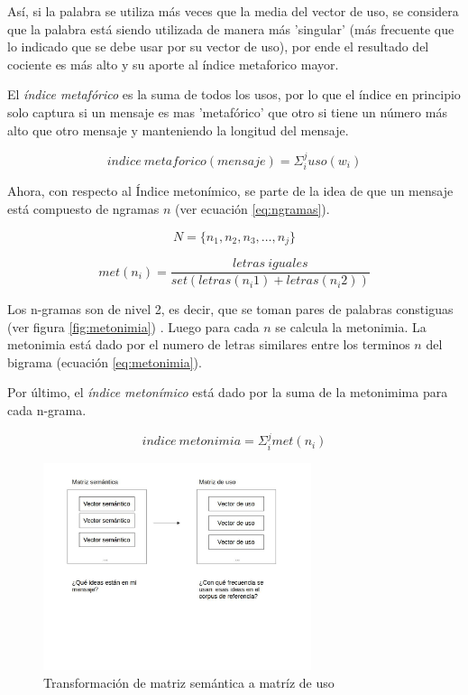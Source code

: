 \documentclass[12pt,letterpaper,twoside]{article}
\begin{document}
Así, si la palabra se utiliza más veces que la media del vector de
uso, se considera que la palabra está siendo utilizada de manera más
'singular' (más frecuente que lo indicado que se debe usar por su
vector de uso), por ende el resultado del cociente es más alto y su
aporte al índice metaforico mayor.




 El \emph{índice metafórico} es la suma de todos los usos, por lo que el
índice en principio solo captura si un mensaje es mas 'metafórico' que
otro si tiene un número más alto que otro mensaje y manteniendo la
longitud del mensaje.


\begin{equation}
\label{eq:indice_metafórico}
indice\ metaforico(mensaje) =  \Sigma_i^j uso(w_i)
\end{equation}


Ahora, con respecto al Índice metonímico, se parte de la idea de que
un mensaje está compuesto de ngramas \(n\) (ver ecuación
\ref{eq:ngramas}).


\begin{equation}
\label{eq:ngramas}
N = \{n_1, n_2, n_3, \dots , n_j\}
\end{equation}

\begin{equation}
\label{eq:metonimia}
met(n_i) = \frac{letras\ iguales}{ set(letras(n_i1) + letras(n_i2))}
\end{equation}

Los n-gramas son de nivel 2, es decir, que se toman pares de palabras
constiguas (ver figura \ref{fig:metonimia}) .  Luego para cada \(n\) se
calcula la metonimia. La metonimia está dado por el numero de letras
similares entre los terminos \(n\) del bigrama (ecuación
\ref{eq:metonimia}).


Por último, el \emph{índice metonímico} está dado por la suma de la
metonimima para cada n-grama.


\begin{equation}\label{eq:indice_metonimia}
indice\ metonimia = \Sigma_i^j met(n_i)
\end{equation}


\begin{figure}[H]
\centering
\includegraphics[width=0.7\textwidth]{./assets/matrices.jpg}
\caption{\label{fig:matrices}Transformación de matriz semántica a matríz de uso}
\end{figure}
\end{document}
